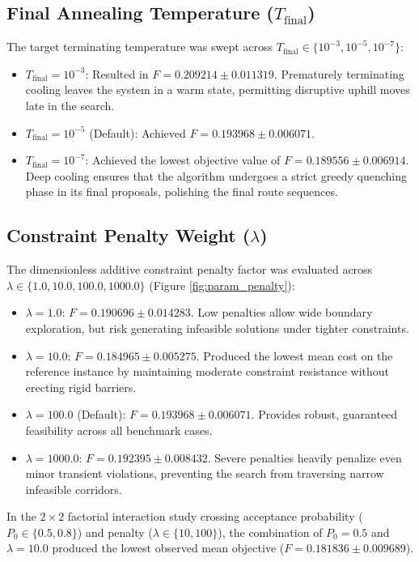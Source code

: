 \subsection{Final Annealing Temperature \texorpdfstring{($T_{\text{final}}$)}{(T\_final)}}
The target terminating temperature was swept across $T_{\text{final}} \in \{10^{-3}, 10^{-5}, 10^{-7}\}$:
\begin{itemize}
    \item $T_{\text{final}} = 10^{-3}$: Resulted in $F = 0.209214 \pm 0.011319$. Prematurely terminating cooling leaves the system in a warm state, permitting disruptive uphill moves late in the search.
    \item $T_{\text{final}} = 10^{-5}$ (Default): Achieved $F = 0.193968 \pm 0.006071$.
    \item $T_{\text{final}} = 10^{-7}$: Achieved the lowest objective value of $F = 0.189556 \pm 0.006914$. Deep cooling ensures that the algorithm undergoes a strict greedy quenching phase in its final proposals, polishing the final route sequences.
\end{itemize}

\subsection{Constraint Penalty Weight \texorpdfstring{($\lambda$)}{(lambda)}}
The dimensionless additive constraint penalty factor was evaluated across $\lambda \in \{1.0, 10.0, 100.0, 1000.0\}$ (Figure \ref{fig:param_penalty}):
\begin{itemize}
    \item $\lambda = 1.0$: $F = 0.190696 \pm 0.014283$. Low penalties allow wide boundary exploration, but risk generating infeasible solutions under tighter constraints.
    \item $\lambda = 10.0$: $F = 0.184965 \pm 0.005275$. Produced the lowest mean cost on the reference instance by maintaining moderate constraint resistance without erecting rigid barriers.
    \item $\lambda = 100.0$ (Default): $F = 0.193968 \pm 0.006071$. Provides robust, guaranteed feasibility across all benchmark cases.
    \item $\lambda = 1000.0$: $F = 0.192395 \pm 0.008432$. Severe penalties heavily penalize even minor transient violations, preventing the search from traversing narrow infeasible corridors.
\end{itemize}
In the $2 \times 2$ factorial interaction study crossing acceptance probability ($P_0 \in \{0.5, 0.8\}$) and penalty ($\lambda \in \{10, 100\}$), the combination of $P_0 = 0.5$ and $\lambda = 10.0$ produced the lowest observed mean objective ($F = 0.181836 \pm 0.009689$).

